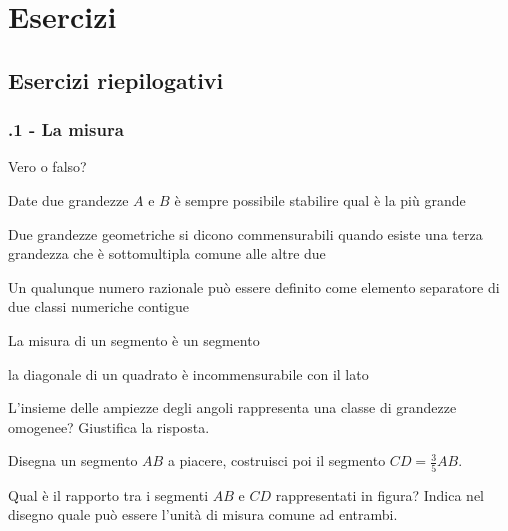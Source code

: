 \section{Esercizi}

\subsection{Esercizi riepilogativi}

\subsubsection*{\thechapter.1 - La misura}

\begin{esercizio}
\label{ese:6.1}
Vero o falso?
\begin{enumeratea}
\item Date due grandezze $A$ e $B$ è sempre possibile stabilire qual è la più grande\hfill\boxV\quad\boxF
\item Due grandezze geometriche si dicono commensurabili quando esiste una terza grandezza che è sottomultipla comune alle altre due \tab\hfill{\boxV\quad\boxF}
\item Un qualunque numero razionale può essere definito come elemento separatore di due classi numeriche contigue\hfill\boxV\quad\boxF
\item La misura di un segmento è un segmento\hfill\boxV\quad\boxF
\item la diagonale di un quadrato è incommensurabile con il lato\hfill\boxV\quad\boxF
\end{enumeratea}
\end{esercizio}

\begin{esercizio}
\label{ese:6.2}
L'insieme delle ampiezze degli angoli rappresenta una classe di grandezze omogenee? Giustifica la risposta.
\end{esercizio}

\begin{esercizio}
\label{ese:6.3}
Disegna un segmento $AB$ a piacere, costruisci poi il segmento $CD=\frac{3}{5}AB$.
\end{esercizio}

\begin{esercizio}
\label{ese:6.4}
Qual è il rapporto tra i segmenti $AB$ e $CD$ rappresentati in figura? Indica nel disegno quale può essere l'unità di misura comune ad entrambi.
\end{esercizio}

